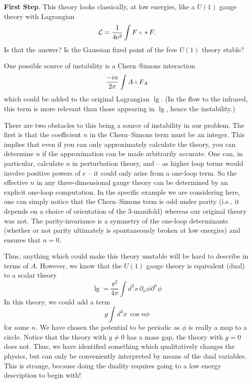 {\bf First Step}.
This theory looks classically, at low energies, like a $U(1)$ gauge theory with
Lagrangian
\begin{equation}
 \lg = \frac1{4\ee^2}\int F\wdg\hstar F.
\end{equation}
Is that the answer?  Is the Gaussian fixed point of the free $U(1)$ theory
stable?

One possible source of instability is a Chern--Simons interaction
\begin{equation}
\frac{-in}{2\pi}\int A\wdg F_A
\end{equation}
which could be added to the original Lagrangian $\lg$.  (In the flow to the
infrared, this term is more relevant than those appearing in $\lg$, hence
the instability.)

There are two obstacles to this being a source of instability in our problem.
The first is that the coefficient $n$ in the Chern--Simons term must be an
integer.  This implies that even if you can only approximately calculate the
theory, you can determine $n$ if the approximation can be made arbitrarily
accurate. One can, in particular, calculate $n$ in perturbation theory,
and -- as higher loop terms would involve positive powers of $e$ -- it could
only arise from a one-loop term.
So the effective $n$ in any three-dimensional gauge theory can be determined
by an explicit one-loop computation.
In the specific example we are considering here,
one  can simply notice that the Chern--Simons term is odd under parity
(i.e., it depends on a choice of orientation of the $3$-manifold) whereas
our original theory was not.  The parity-invariance is  a symmetry of the
one-loop determinants (whether or not parity ultimately is spontaneously
broken at low energies) and ensures that $n=0$.



Thus, anything which could make this theory unstable will be hard to
describe in terms of $A$.  However, we know that the $U(1)$ gauge theory is
equivalent (dual) to a scalar theory
\begin{equation}
\lg=\frac{\ee^2}{4\pi}\int d^3x\,\partial_\alpha\phi\partial^\alpha\phi
\end{equation}
In this theory, we could add a term
\begin{equation}
g\int d^3x\,\cos n\phi
\end{equation}
for some $n$.
We have chosen the potential to be periodic as $\phi$ is really a map
to a circle.
Notice that the theory with $g\ne0$ has a mass gap, the theory with $g=0$
does not.
Thus, we have identified something which qualitatively changes the physics,
but can only be conveniently interpreted by means of the dual variables.
This is strange, because doing the duality requires going to a low
energy description to begin with!

